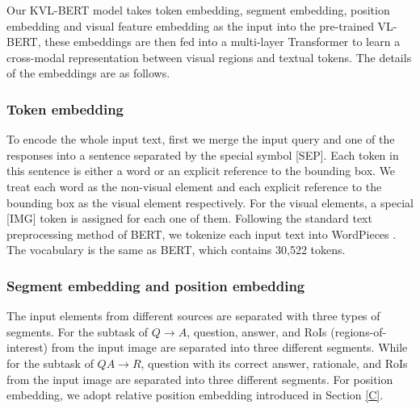 \documentclass[conference]{IEEEtran}
\begin{document}
Our KVL-BERT model takes token embedding, segment embedding, position embedding and visual feature embedding as the input into the pre-trained VL-BERT, these embeddings are then fed into a multi-layer Transformer to learn a cross-modal representation between visual regions and textual tokens. The details of the embeddings are as follows.


\subsubsection{Token embedding}
To encode the whole input text, first we merge the input query and one of the responses into a sentence separated by the special symbol [SEP]. Each token in this sentence is either a word or an explicit reference to the bounding box. We treat each word as the non-visual element and each explicit reference to the bounding box as the visual element respectively. For the visual elements, a special [IMG] token is assigned for each one of them. Following the standard text preprocessing method of BERT, we tokenize each input text into WordPieces \cite{b38}. The vocabulary is the same as BERT, which contains 30,522 tokens. 

\subsubsection{Segment embedding and position embedding}
The input elements from different sources are separated with three types of segments. For the subtask of $Q \rightarrow A$, question, answer, and RoIs (regions-of-interest) from the input image are separated into three different segments. While for the subtask of $QA \rightarrow R$, question with its correct answer, rationale, and RoIs from the input image are separated into three different segments. For position embedding, we adopt relative position embedding introduced in Section \ref{C}. 
\end{document}
